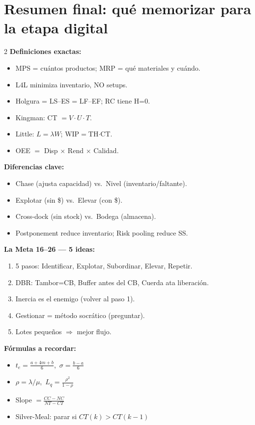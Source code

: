 \section{Resumen final: qué memorizar para la etapa digital}

\begin{memorizar}
\begin{multicols}{2}
\textbf{Definiciones exactas:}
\begin{itemize}[leftmargin=1.2em, itemsep=0pt]
  \item MPS = cuántos productos; MRP = qué materiales y cuándo.
  \item L4L minimiza inventario, NO setups.
  \item Holgura = LS--ES = LF--EF; RC tiene H=0.
  \item Kingman: CT $= V\cdot U\cdot T$.
  \item Little: $L=\lambda W$; WIP$=$TH$\cdot$CT.
  \item OEE $=$ Disp $\times$ Rend $\times$ Calidad.
\end{itemize}

\textbf{Diferencias clave:}
\begin{itemize}[leftmargin=1.2em, itemsep=0pt]
  \item Chase (ajusta capacidad) vs.\ Nivel (inventario/faltante).
  \item Explotar (sin \$) vs.\ Elevar (con \$).
  \item Cross-dock (sin stock) vs.\ Bodega (almacena).
  \item Postponement reduce inventario; Risk pooling reduce SS.
\end{itemize}

\columnbreak

\textbf{La Meta 16--26 --- 5 ideas:}
\begin{enumerate}[leftmargin=1.2em, itemsep=0pt]
  \item 5 pasos: Identificar, Explotar, Subordinar, Elevar, Repetir.
  \item DBR: Tambor=CB, Buffer antes del CB, Cuerda ata liberación.
  \item Inercia es el enemigo (volver al paso 1).
  \item Gestionar = método socrático (preguntar).
  \item Lotes pequeños $\Rightarrow$ mejor flujo.
\end{enumerate}

\textbf{Fórmulas a recordar:}
\begin{itemize}[leftmargin=1.2em, itemsep=0pt]
  \item $t_e = \tfrac{a+4m+b}{6}$,\ $\sigma=\tfrac{b-a}{6}$
  \item $\rho=\lambda/\mu$,\ $L_q=\tfrac{\rho^2}{1-\rho}$
  \item Slope $=\tfrac{CC-NC}{NT-CT}$
  \item Silver-Meal: parar si $CT(k)\!>\!CT(k\!-\!1)$
\end{itemize}
\end{multicols}
\end{memorizar}


